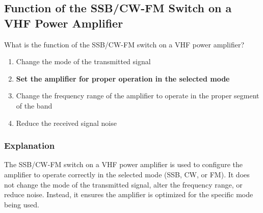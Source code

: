 \subsection{Function of the SSB/CW-FM Switch on a VHF Power Amplifier}
\label{T7A09}

\begin{tcolorbox}[colback=gray!10!white,colframe=black!75!black,title=T7A09]
What is the function of the SSB/CW-FM switch on a VHF power amplifier?
\begin{enumerate}[noitemsep]
    \item Change the mode of the transmitted signal
    \item \textbf{Set the amplifier for proper operation in the selected mode}
    \item Change the frequency range of the amplifier to operate in the proper segment of the band
    \item Reduce the received signal noise
\end{enumerate}
\end{tcolorbox}

\subsubsection*{Explanation}
The SSB/CW-FM switch on a VHF power amplifier is used to configure the amplifier to operate correctly in the selected mode (SSB, CW, or FM). It does not change the mode of the transmitted signal, alter the frequency range, or reduce noise. Instead, it ensures the amplifier is optimized for the specific mode being used.